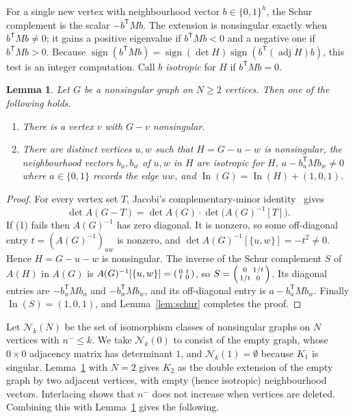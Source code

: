 \documentclass[11pt]{amsart}
\newtheorem{lemma}[theorem]{Lemma}
\theoremstyle{definition}
\theoremstyle{remark}
\newcommand{\In}{\operatorname{In}}
\newcommand{\adj}{\operatorname{adj}}
\begin{document}
For a single new vertex with neighbourhood vector $b\in\{0,1\}^h$, the Schur complement is the scalar $-b^{\mathsf T}Mb$. The extension is nonsingular exactly when $b^{\mathsf T}Mb\ne0$; it gains a positive eigenvalue if $b^{\mathsf T}Mb<0$ and a negative one if $b^{\mathsf T}Mb>0$. Because $\operatorname{sign}(b^{\mathsf T}Mb)=\operatorname{sign}(\det H)\operatorname{sign}(b^{\mathsf T}(\adj H)b)$, this test is an integer computation. Call $b$ \emph{isotropic} for $H$ if $b^{\mathsf T}Mb=0$.

\begin{lemma}\label{lem:jacobi}
Let $G$ be a nonsingular graph on $N\ge2$ vertices. Then one of the following holds.
\begin{enumerate}
\item There is a vertex $v$ with $G-v$ nonsingular.
\item There are distinct vertices $u,w$ such that $H=G-u-w$ is nonsingular, the neighbourhood vectors $b_u,b_w$ of $u,w$ in $H$ are isotropic for $H$, $a-b_u^{\mathsf T}Mb_w\ne0$ where $a\in\{0,1\}$ records the edge $uw$, and $\In(G)=\In(H)+(1,0,1)$.
\end{enumerate}
\end{lemma}

\begin{proof}
For every vertex set $T$, Jacobi's complementary-minor identity~\cite{HornJohnson2013} gives
\[
\det A(G-T)=\det A(G)\cdot\det\bigl(A(G)^{-1}[T]\bigr).
\] If (1) fails then $A(G)^{-1}$ has zero diagonal. It is nonzero, so some off-diagonal entry $t=(A(G)^{-1})_{uw}$ is nonzero, and $\det A(G)^{-1}[\{u,w\}]=-t^2\neq0$. Hence $H=G-u-w$ is nonsingular. The inverse of the Schur complement $S$ of $A(H)$ in $A(G)$ is $A(G)^{-1}[\{u,w\}]=\begin{psmallmatrix}0&t\\t&0\end{psmallmatrix}$, so $S=\begin{psmallmatrix}0&1/t\\1/t&0\end{psmallmatrix}$. Its diagonal entries are $-b_u^{\mathsf T}Mb_u$ and $-b_w^{\mathsf T}Mb_w$, and its off-diagonal entry is $a-b_u^{\mathsf T}Mb_w$. Finally $\In(S)=(1,0,1)$, and Lemma~\ref{lem:schur} completes the proof.
\end{proof}

Let $\mathcal N_k(N)$ be the set of isomorphism classes of nonsingular graphs on $N$ vertices with $n^-\le k$. We take $\mathcal N_k(0)$ to consist of the empty graph, whose $0\times0$ adjacency matrix has determinant $1$, and $\mathcal N_k(1)=\emptyset$ because $K_1$ is singular. Lemma~\ref{lem:jacobi} with $N=2$ gives $K_2$ as the double extension of the empty graph by two adjacent vertices, with empty (hence isotropic) neighbourhood vectors. Interlacing shows that $n^-$ does not increase when vertices are deleted. Combining this with Lemma~\ref{lem:jacobi} gives the following.
\end{document}
